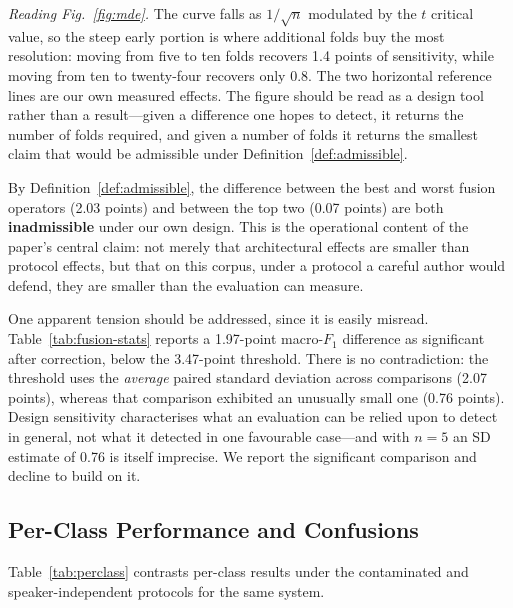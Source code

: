 \documentclass[journal,onecolumn,11pt,draftclsnofoot]{IEEEtran}   %
\begin{document}
\emph{Reading Fig.~\ref{fig:mde}.} The curve falls as $1/\sqrt{n}$ modulated by
the $t$ critical value, so the steep early portion is where additional folds buy
the most resolution: moving from five to ten folds recovers 1.4 points of
sensitivity, while moving from ten to twenty-four recovers only 0.8. The two
horizontal reference lines are our own measured effects. The figure should be
read as a design tool rather than a result---given a difference one hopes to
detect, it returns the number of folds required, and given a number of folds it
returns the smallest claim that would be admissible under
Definition~\ref{def:admissible}.

By Definition~\ref{def:admissible}, the difference between the best and worst
fusion operators (2.03 points) and between the top two (0.07 points) are both
\textbf{inadmissible} under our own design. This is the operational content of
the paper's central claim: not merely that architectural effects are smaller
than protocol effects, but that on this corpus, under a protocol a careful
author would defend, they are smaller than the evaluation can measure.

One apparent tension should be addressed, since it is easily misread.
Table~\ref{tab:fusion-stats} reports a 1.97-point macro-$F_1$ difference as
significant after correction, below the 3.47-point threshold. There is no
contradiction: the threshold uses the \emph{average} paired standard deviation
across comparisons (2.07 points), whereas that comparison exhibited an unusually
small one (0.76 points). Design sensitivity characterises what an evaluation can
be relied upon to detect in general, not what it detected in one favourable
case---and with $n=5$ an SD estimate of 0.76 is itself imprecise. We report the
significant comparison and decline to build on it.

\subsection{Per-Class Performance and Confusions}
\label{sec:perclass}
Table~\ref{tab:perclass} contrasts per-class results under the contaminated and
speaker-independent protocols for the same system.
\end{document}
